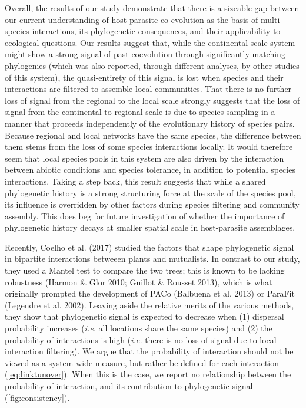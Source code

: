 \documentclass[12pt]{article}
\begin{document}
Overall, the results of our study demonstrate that there is a sizeable
gap between our current understanding of host-parasite co-evolution as
the basis of multi-species interactions, its phylogenetic consequences,
and their applicability to ecological questions. Our results suggest
that, while the continental-scale system might show a strong signal of
past coevolution through significantly matching phylogenies (which was
also reported, through different analyses, by other studies of this
system), the quasi-entirety of this signal is lost when species and
their interactions are filtered to assemble local communities. That
there is no further loss of signal from the regional to the local scale
strongly suggests that the loss of signal from the continental to
regional scale is due to species sampling in a manner that proceeds
independently of the evolutionary history of species pairs. Because
regional and local networks have the same species, the difference
between them stems from the loss of some species interactions locally.
It would therefore seem that local species pools in this system are also
driven by the interaction between abiotic conditions and species
tolerance, in addition to potential species interactions. Taking a step
back, this result suggests that while a shared phylogenetic history is a
strong structuring force at the scale of the species pool, its influence
is overridden by other factors during species filtering and community
assembly. This does beg for future investigation of whether the
importance of phylogenetic history decays at smaller spatial scale in
host-parasite assemblages.

Recently, Coelho et al. (2017) studied the factors that shape
phylogenetic signal in bipartite interactions betweeen plants and
mutualists. In contrast to our study, they used a Mantel test to compare
the two trees; this is known to be lacking robustness (Harmon \& Glor
2010; Guillot \& Rousset 2013), which is what originally prompted the
development of PACo (Balbuena et al. 2013) or ParaFit (Legendre et al.
2002). Leaving aside the relative merits of the various methods, they
show that phylogenetic signal is expected to decrease when (1) dispersal
probability increases (\emph{i.e.} all locations share the same species)
and (2) the probability of interactions is high (\emph{i.e.} there is no
loss of signal due to local interaction filtering). We argue that the
probability of interaction should not be viewed as a system-wide
measure, but rather be defined for each interaction
(\cref{eq:linktunover}). When this is the case, we report
no relationship between the probability of interaction, and its
contribution to phylogenetic signal
(\cref{fig:consistency}).
\end{document}
